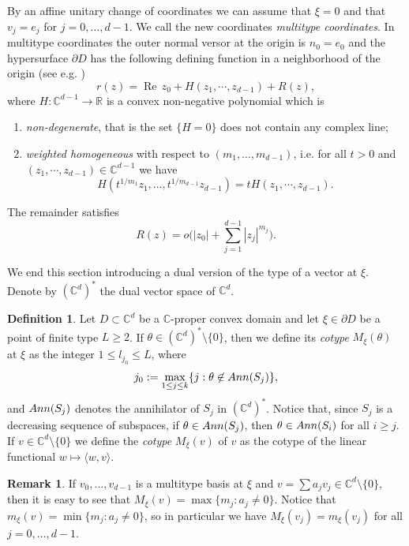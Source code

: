 \documentclass[11pt, reqno]{amsart}
\numberwithin{equation}{section}
\theoremstyle{definition}
\newtheorem{remark}[theorem]{Remark}
\newtheorem{definition}[theorem]{Definition}
\newcommand{\C}{\mathbb{C}}
\newcommand{\R}{\mathbb{R}}
\renewcommand{\Re}{{\operatorname{Re}\,}}
\begin{document}
{		By an affine unitary change of coordinates we can assume that $\xi=0$ and that  $v_j =e_j$ for $j=0,\dots, d-1$. 
		We call the new coordinates {\sl multitype coordinates}. In  multitype coordinates the outer normal  versor at the origin is $n_0=e_0$ and
		the hypersurface $\partial D$ has the following defining function in a neighborhood of the origin (see e.g. \cite{Gauss})
		\begin{equation}\label{normalform}
			r(z)=\Re z_0+H(z_1,\cdots,z_{d-1})+R(z),
		\end{equation}
		where $H\colon\C^{d-1}\longrightarrow\R$ is a convex non-negative polynomial which is 
		\begin{enumerate}
			\item {\sl  non-degenerate}, that is the set $\{H=0\}$ does not contain any complex line;
			\item {\sl weighted homogeneous} with respect to $(m_1,\dots,m_{d-1})$, i.e. for all $t>0$ and $(z_1,\cdots,z_{d-1})\in\C^{d-1}$ we have
			$$H\left(t^{1\slash m_1}z_1,\dots,t^{1\slash m_{d-1}}z_{d-1}\right)=tH(z_1,\cdots,z_{d-1}).$$
		\end{enumerate}
		
		The remainder satisfies
		$$R(z)=o\bigg(|z_0|+\sum_{j=1}^{d-1}|z_j|^{m_j}\bigg).$$
		
		We end this section introducing a dual version of the type of a vector at $\xi$. Denote by $(\C^d)^*$ the dual vector space of $\C^d$.
		\begin{definition}
			Let $D\subset \C^d$ be a $\C$-proper convex domain and let $\xi\in \partial D$ be a point of finite type $L\geq 2$.
			If $\theta\in (\C^d)^*\setminus\{0\}$, then we define its {\sl cotype} $M_\xi(\theta)$ at $\xi$ as the integer $1\leq l_{j_0}\leq L$, where $$j_0:=\max_{1\leq j\leq k}\{j:\theta\not\in {\rm Ann}(S_j)\},$$
			and $ {\rm Ann}(S_j)$ denotes the annihilator of $S_j$ in $(\C^d)^*$.
			Notice that, since $S_j$ is a decreasing sequence of subspaces, if $\theta\in  {\rm Ann}(S_j)$, then $\theta\in  {\rm Ann}(S_i)$ for all $i\geq j$.
			If $v\in \C^d\setminus\{0\}$ we
			define the {\sl cotype}  $M_\xi(v)$ of $v$ as the cotype of the linear functional $w\mapsto \langle w,v\rangle $.
		\end{definition}
		\begin{remark}
			If $v_0,\dots, v_{d-1}$ is a multitype basis at $\xi$ and $v=\sum a_j v_j\in \C^{d}\setminus\{0\}$, then 
			it is easy to see that $M_\xi(v)=\max\{m_j: a_j\neq0\}$.
			Notice that $m_\xi(v)=\min\{m_j: a_j\neq0\}$, so in particular we have $M_\xi(v_j)=m_\xi(v_j)$ for all $j=0,\dots,d-1$.
			

\end{remark}}
\end{document}
